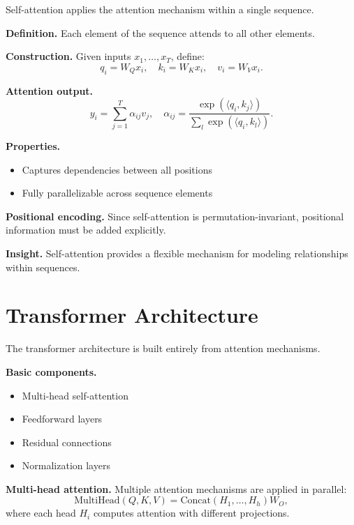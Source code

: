Self-attention applies the attention mechanism within a single sequence.

\medskip

\noindent
\textbf{Definition.}  
Each element of the sequence attends to all other elements.

\medskip

\noindent
\textbf{Construction.}  
Given inputs $x_1, \dots, x_T$, define:
\[
q_i = W_Q x_i, \quad k_i = W_K x_i, \quad v_i = W_V x_i.
\]

\medskip

\noindent
\textbf{Attention output.}
\[
y_i = \sum_{j=1}^T \alpha_{ij} v_j,
\quad
\alpha_{ij} = \frac{\exp(\langle q_i, k_j \rangle)}{\sum_{l} \exp(\langle q_i, k_l \rangle)}.
\]

\medskip

\noindent
\textbf{Properties.}
\begin{itemize}
    \item Captures dependencies between all positions
    \item Fully parallelizable across sequence elements
\end{itemize}

\medskip

\noindent
\textbf{Positional encoding.}  
Since self-attention is permutation-invariant, positional information must be added explicitly.

\medskip

\noindent
\textbf{Insight.}  
Self-attention provides a flexible mechanism for modeling relationships within sequences.

\section{Transformer Architecture}

The transformer architecture is built entirely from attention mechanisms.

\medskip

\noindent
\textbf{Basic components.}
\begin{itemize}
    \item Multi-head self-attention
    \item Feedforward layers
    \item Residual connections
    \item Normalization layers
\end{itemize}

\medskip

\noindent
\textbf{Multi-head attention.}  
Multiple attention mechanisms are applied in parallel:
\[
\mathrm{MultiHead}(Q,K,V) = \mathrm{Concat}(H_1, \dots, H_h) W_O,
\]
where each head $H_i$ computes attention with different projections.


